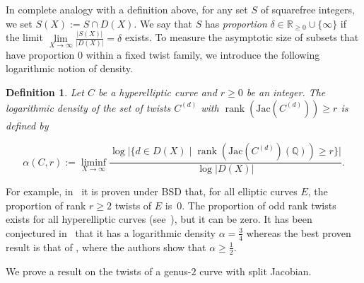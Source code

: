 \documentclass{amsart}
\newcommand{\Q}{{\mathbb Q}}
\newcommand{\R}{{\mathbb R}}
\newcommand{\Jac}{\mathrm{Jac}}
\DeclareMathOperator{\rank}{\mathrm{rank}}
\newtheorem{definition}{Definition}
\begin{document}
In complete analogy with a definition above, for any set $S$ of squarefree integers, we set
$S(X) := S \cap D(X)$. We say that $S$ has \emph{proportion} $\delta \in \R_{\ge 0} \cup \{\infty\}$ if
the limit $\lim\limits_{X \to \infty} \frac{|S(X)|}{|D(X)|} = \delta$
exists. To measure the asymptotic size of subsets that have proportion $0$ within
a fixed twist family, we introduce the following logarithmic notion of density.


\begin{definition}
Let $C$ be a hyperelliptic curve and $r \ge 0$ be an integer. The logarithmic density of the set of twists $C^{(d)}$ with $\rank(\Jac(C^{(d)})) \ge r$ is defined by

\[
\alpha(C, r):=\liminf_{X \to \infty}
\frac{
\log \bigl| \{ d \in D(X) \mid \rank(\Jac(C^{(d)})(\Q)) \ge r \} \bigr|
}{
\log |D(X)|
}.
\]
 
\end{definition}



For example, in~\cite{Smith2025} it is proven under BSD that, for all elliptic curves $E$, the proportion of rank $r\geq 2$ twists of $E$ is~$0$. The proportion of odd rank twists exists for all hyperelliptic curves (see~\cite{Yu2019}), but it can be zero. It has been conjectured in~\cite{Watkins2008} that it has a logarithmic density $\alpha=\frac{3}{4}$ whereas the best proven result is that of \cite{Gouvea1991}, where the authors show that $\alpha\geq \frac{1}{2}$. \medskip





We prove a result on the twists of a genus-$2$ curve with split Jacobian.
\end{document}
